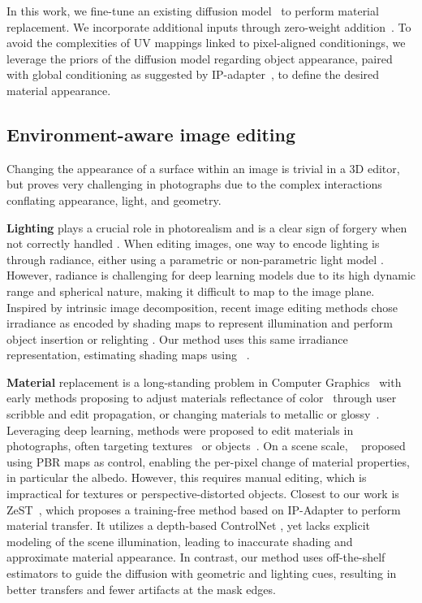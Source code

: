 In this work, we fine-tune an existing diffusion model~\cite{rombach2021highresolution} to perform material replacement. We incorporate additional inputs through zero-weight addition~\cite{zhang2023controlnet}. 
To avoid the complexities of UV mappings linked to pixel-aligned conditionings, we leverage the priors of the diffusion model regarding object appearance, paired with global conditioning as suggested by IP-adapter~\cite{ye2023ipadapter}, to define the desired material appearance. 



\subsection{Environment-aware image editing}
Changing the appearance of a surface within an image is trivial in a 3D editor, but proves very challenging in photographs due to the complex interactions conflating appearance, light, and geometry.

\textbf{Lighting} plays a crucial role in photorealism and is a clear sign of forgery when not correctly handled \cite{kee2013exposing}. When editing images, one way to encode lighting is through radiance, either using a parametric \cite{griffiths2022outcast,gardner2019deep,poirier2024diffusion} or non-parametric light model \cite{pandey2021total,gardner2017learning}. However, radiance is challenging for deep learning models due to its high dynamic range and spherical nature, making it difficult to map to the image plane. Inspired by intrinsic image decomposition, recent image editing methods chose irradiance as encoded by shading maps to represent illumination and perform object insertion \cite{zhang2024zerocomp,fortier2024spotlight} or relighting \cite{kocsis2024lightit,ponglertnapakorn2023difareli,yu2020self}. Our method uses this same irradiance representation, estimating shading maps using \rgbtooxx~. 

\textbf{Material} replacement is a long-standing problem in Computer Graphics~\cite{an2008appprop, khan2006image} with early methods proposing to adjust materials reflectance of color~\cite{an2008appprop} through user scribble and edit propagation, or changing materials to metallic or glossy~\cite{khan2006image}. Leveraging deep learning, methods were proposed to edit materials in photographs, often targeting textures~\cite{guerrero2024texsliders} or objects~\cite{delanoy2022generative, cheng2024zest,sharma2024alchemist}. On a scene scale, \rgbtooxx~ proposed using PBR maps as control, enabling the per-pixel change of material properties, in particular the albedo. However, this requires manual editing, which is impractical for textures or perspective-distorted objects. 
Closest to our work is ZeST~\cite{cheng2024zest}, which proposes a training-free method based on IP-Adapter to perform material transfer. It utilizes a depth-based ControlNet \cite{zhang2023controlnet}, yet lacks explicit modeling of the scene illumination, leading to inaccurate shading and approximate material appearance. In contrast, our method uses off-the-shelf estimators to guide the diffusion with geometric and lighting cues, resulting in better transfers and fewer artifacts at the mask edges.

